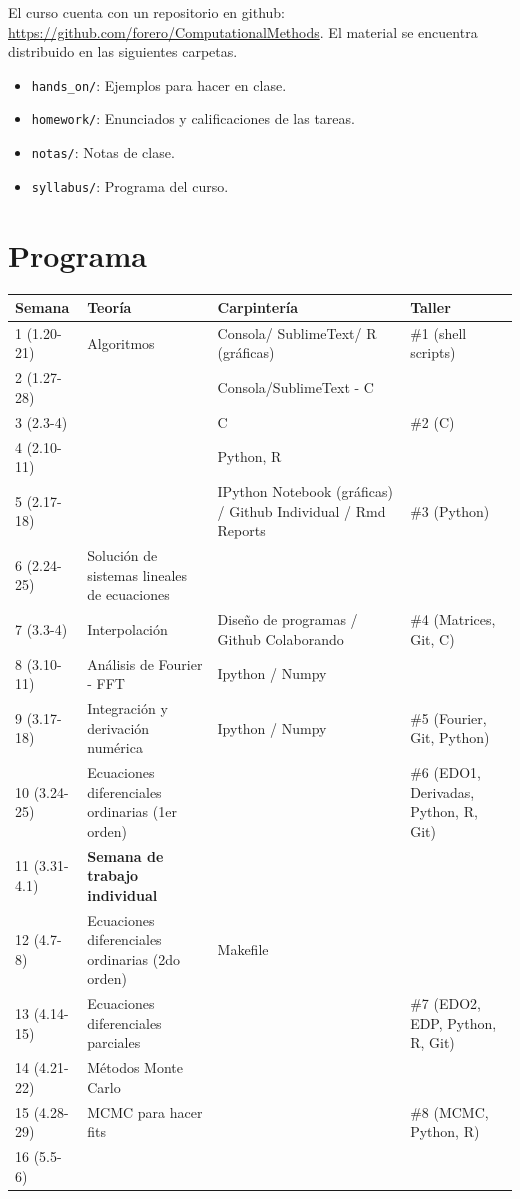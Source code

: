 \documentclass[11pt]{article}
\begin{document}
El curso cuenta con un repositorio en github:
\url{https://github.com/forero/ComputationalMethods}. El material se
encuentra distribuido en las siguientes carpetas. 


\begin{itemize}
\item \texttt{hands\_on/}: Ejemplos para hacer en clase.
\item \texttt{homework/}: Enunciados y calificaciones de las tareas.
\item \texttt{notas/}: Notas de clase.
\item \texttt{syllabus/}: Programa del curso.
\end{itemize}
 
 

\section*{Programa}

\begin{center}
\begin{tabular}{|p{2.1cm}|p{5.7cm}|p{4.0cm}|p{4.5cm}|}
\hline

Semana & Teor\'ia & Carpinter\'ia & Taller \\\hline
1 (1.20-21) & Algoritmos	& Consola/ SublimeText/ R (gr\'aficas) & \#1 (shell scripts)\\\hline
2 (1.27-28)& 	& Consola/SublimeText - C  & \\\hline
3 (2.3-4)& 	&C  & \#2 (C)\\\hline
4 (2.10-11)& 	&Python, R &  \\\hline
5 (2.17-18)& 	&IPython Notebook (gr\'aficas) / Github Individual / Rmd Reports & \#3
(Python) \\\hline
6 (2.24-25)&      Soluci\'on de sistemas lineales de ecuaciones &  & \\\hline
7 (3.3-4)&  Interpolaci\'on & Dise\~no de programas / Github Colaborando &\#4
(Matrices, Git, C) \\ \hline
8 (3.10-11)& An\'alisis de Fourier - FFT &  Ipython / Numpy& \\\hline
9 (3.17-18) & Integraci\'on y derivaci\'on num\'erica & Ipython / Numpy & \#5 (Fourier, Git, Python) \\\hline
10 (3.24-25) & Ecuaciones diferenciales ordinarias (1er orden)& &  \#6
(EDO1, Derivadas, Python, R, Git)\\\hline
11 (3.31-4.1) & {\bf Semana de trabajo individual} & &\\\hline
12 (4.7-8)& Ecuaciones diferenciales ordinarias (2do orden)&  Makefile &   \\\hline 
13 (4.14-15) & Ecuaciones diferenciales parciales & & \#7 (EDO2, EDP, Python, R, Git)\\\hline
14 (4.21-22) & M\'etodos Monte Carlo &   & \\\hline
15 (4.28-29) & MCMC para hacer fits &    & \#8 (MCMC, Python, R)\\\hline
16 (5.5-6) &  &    & \\\hline

\hline
\end{tabular}
\end{center}
\end{document}
